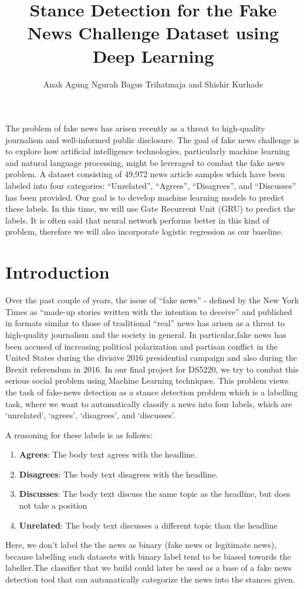 \documentclass[12pt]{article}
\title{Stance Detection for the Fake News Challenge Dataset using Deep Learning}
\author{Anak Agung Ngurah Bagus Trihatmaja and Shishir Kurhade}
\date{}
\begin{document}
\maketitle

\abstract
The problem of fake news has arisen recently as a threat to high-quality 
journalism and well-informed public disclosure. 
The goal of fake news challenge is to explore how artificial intelligence 
technologies, particularly machine learning and 
natural language processing, might be leveraged to combat the fake news problem.
A dataset consisting of 49,972 news article samples which have been labeled 
into four categories: 
“Unrelated”, “Agrees”, “Disagrees”, and “Discusses” has been provided.
Our goal is to develop machine learning models to predict these labels. 
In this time, we will use Gate Recurrent Unit (GRU) to predict the labels.
It is often said that neural network performs better in this kind of problem,
therefore we will also incorporate logistic regression as our baseline.


\section{Introduction}
Over the past couple of years, the issue of “fake news” \-- defined by the 
New York Times as “made-up stories written with the intention to deceive” and 
published in formats similar to those of traditional “real” news has arisen as 
a threat to high-quality journalism and the society in general. 
In particular,fake news has been accused of increasing political polarization 
and partisan conflict in the United States during the divisive 2016 
presidential campaign and also during the Brexit referendum in 2016.
In our final project for DS5220, we try to combat this serious social problem 
using Machine Learning techniques. This problem views the task of fake-news 
detection as a stance detection problem which is a labelling task, 
where we want to automatically classify a news into four labels, 
which are ‘unrelated’, ‘agrees’, ‘disagrees’, and ‘discusses’.  

A reasoning for these labels is as follows:
\begin{enumerate}
  \item \textbf{Agrees}: The body text agrees with the headline.
  \item \textbf{Disagrees}: The body text disagrees with the headline.
  \item \textbf{Discusses}: The body text discuss the same topic as the headline, 
    but does not take a position
  \item \textbf{Unrelated}: The body text discusses a different topic than the headline
\end{enumerate}
Here, we don’t label the the news as binary (fake news or legitimate news),
because labelling such datasets with binary label tend to be biased towards 
the labeller.The classifier that we build could later be used as a base of a 
fake news detection tool that can automatically categorize the news into the 
stances given.
\end{document}

